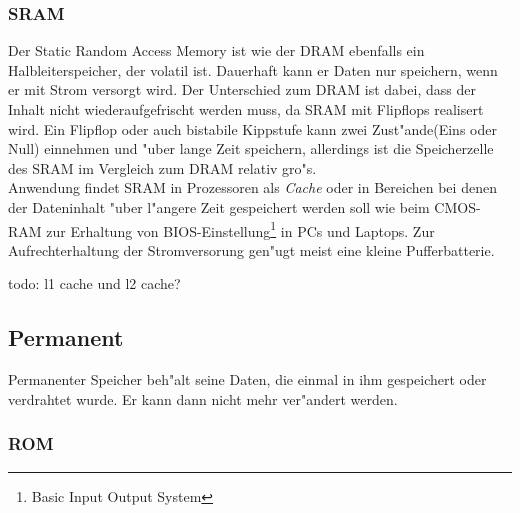 				\subsubsection{SRAM}
				\label{ch:Technisch:sec:Elektronische Speicherung:sub:Fl"uchtig:subsub:SRAM}
				
					Der \glqq Static Random Access Memory\grqq{} ist wie der DRAM ebenfalls ein Halbleiterspeicher, der volatil ist. Dauerhaft kann er Daten nur speichern, wenn er mit Strom versorgt wird. Der Unterschied zum DRAM ist dabei, dass der Inhalt nicht wiederaufgefrischt werden muss, da SRAM mit Flipflops realisert wird. Ein Flipflop oder auch bistabile Kippstufe kann zwei Zust"ande(Eins oder Null) einnehmen und "uber lange Zeit speichern, allerdings ist die Speicherzelle des SRAM im Vergleich zum DRAM relativ gro"s.
					\\
					Anwendung findet SRAM in Prozessoren als \textit{Cache} oder in Bereichen bei denen der Dateninhalt "uber l"angere Zeit gespeichert werden soll wie beim CMOS-RAM zur Erhaltung von BIOS-Einstellung\footnote{Basic Input Output System} in PCs und Laptops. Zur Aufrechterhaltung der Stromversorung gen"ugt meist eine kleine Pufferbatterie.
					
					todo: l1 cache und l2 cache?
        
        \subsection{Permanent}
        \label{ch:Technisch:sec:Elektronische Speicherung:sub:Permanent}
        
            Permanenter Speicher beh"alt seine Daten, die einmal in ihm gespeichert oder verdrahtet wurde. Er kann dann nicht mehr ver"andert werden.
			
				\subsubsection{ROM}
				\label{ch:Technisch:sec:Elektronische Speicherung:sub:Fl"uchtig:subsub:ROM}
				
